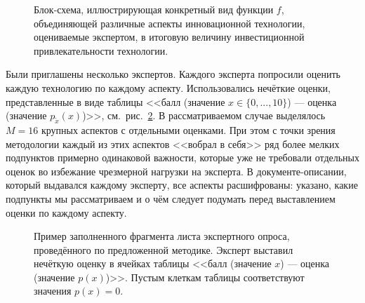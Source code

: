 \begin{figure}[h]
\caption{\small Блок-схема, иллюстрирующая конкретный вид функции $f$, объединяющей различные аспекты инновационной технологии, оцениваемые экспертом, в итоговую величину инвестиционной привлекательности технологии. }
\label{ris:tech_scheme}
\end{figure}

Были приглашены несколько экспертов. Каждого эксперта попросили оценить каждую технологию по каждому аспекту. Использовались нечёткие оценки, представленные в виде таблицы <<балл (значение $x \in \{0, ..., 10\}$) --- оценка (значение $p_{\tilde x}(x)$)>>, см.~рис.~\ref{ris:expert_sample}. В рассматриваемом случае выделялось $M = 16$ крупных аспектов с отдельными оценками. При этом с точки зрения методологии каждый из этих аспектов <<вобрал в себя>> ряд более мелких подпунктов примерно одинаковой важности, которые уже не требовали отдельных оценок во избежание чрезмерной нагрузки на эксперта. В документе-описании, который выдавался каждому эксперту, все аспекты расшифрованы: указано, какие подпункты мы рассматриваем и о чём следует  подумать перед выставлением оценки по каждому аспекту.
 
\begin{figure}[h]
\caption{\small Пример заполненного фрагмента листа экспертного опроса, проведённого по предложенной методике. Эксперт выставил нечёткую оценку в ячейках таблицы <<балл (значение $x$) --- оценка (значение $p(x)$)>>. Пустым клеткам таблицы соответствуют значения $p(x) = 0$. }
\label{ris:expert_sample}
\end{figure}

